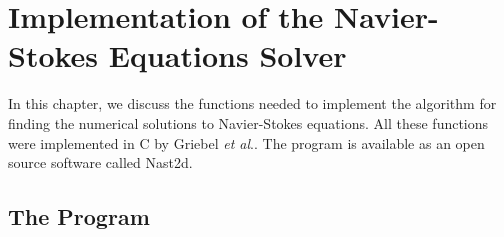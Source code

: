 
%

\chapter{Implementation of the Navier-Stokes Equations Solver}

In this chapter, we discuss the functions needed to implement the algorithm for finding the numerical solutions to Navier-Stokes equations. All these functions were implemented in 
C by Griebel {\em et al}.\cite{nsfd}. The program is available as an open source software called Nast2d.  

\section{The Program}

